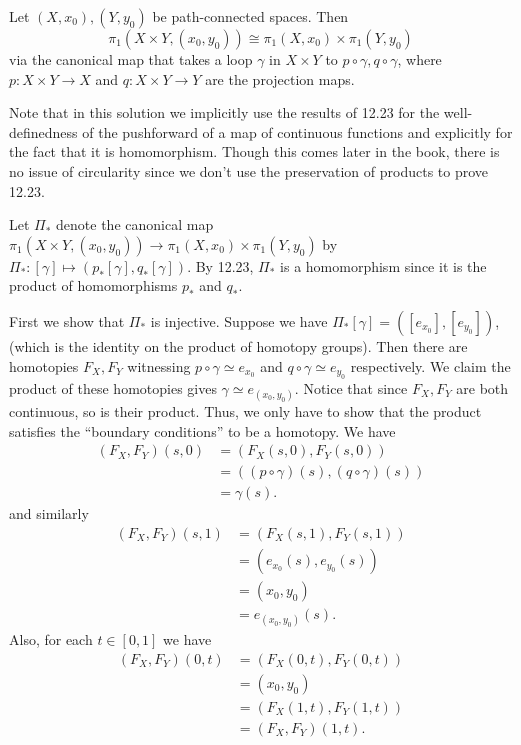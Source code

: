 \documentclass[12 pt, letterpaper]{hmcpset}
\begin{document}
\begin{problem}[12.20]
	Let $(X, x_{0}), (Y, y_{0})$ be path-connected spaces. Then
	\[
		\pi_{1}(X \times Y, (x_{0}, y_{0})) \cong \pi_{1}(X, x_{0}) \times \pi_{1}(Y, y_{0})
	\]
	via the canonical map that takes a loop $\gamma$ in $X \times Y$ to $p \circ \gamma, q \circ \gamma$, where $p : X \times Y \to X$ and $q : X \times Y \to Y$ are the projection maps.
\end{problem}

\begin{solution}
	Note that in this solution we implicitly use the results of 12.23 for the well-definedness of the pushforward of a map of continuous functions and explicitly for the fact that it is homomorphism. Though this comes later in the book, there is no issue of circularity since we don't use the preservation of products to prove 12.23.

	Let $\Pi_{*}$ denote the canonical map $\pi_{1}(X \times Y, (x_{0}, y_{0})) \to \pi_{1}(X, x_{0}) \times \pi_{1}(Y, y_{0})$ by $\Pi_{*} : [\gamma] \mapsto (p_{*} [\gamma], q_{*} [\gamma])$. By 12.23, $\Pi_{*}$ is a homomorphism since it is the product of homomorphisms $p_{*}$ and $q_{*}$.

	First we show that $\Pi_{*}$ is injective. Suppose we have $\Pi_{*}[\gamma] = ([e_{x_{0}}], [e_{y_{0}}])$, (which is the identity on the product of homotopy groups). Then there are homotopies $F_{X}, F_{Y}$ witnessing $p \circ \gamma \simeq e_{x_{0}}$ and $q \circ \gamma \simeq e_{y_{0}}$ respectively. We claim the product of these homotopies gives $\gamma \simeq e_{(x_{0}, y_{0})}$. Notice that since $F_{X}, F_{Y}$ are both continuous, so is their product. Thus, we only have to show that the product satisfies the ``boundary conditions'' to be a homotopy. We have
	\begin{align*}
		(F_{X}, F_{Y})(s, 0) & = (F_{X}(s, 0), F_{Y}(s, 0)) \\
				     & = ((p \circ \gamma)(s), (q \circ \gamma)(s)) \\
				     & = \gamma(s).
	\end{align*}
	and similarly
	\begin{align*}
		(F_{X}, F_{Y})(s, 1) & = (F_{X}(s, 1), F_{Y}(s, 1)) \\
				     & = (e_{x_{0}}(s), e_{y_{0}}(s)) \\
				     & = (x_{0}, y_{0}) \\
				     & = e_{(x_{0}, y_{0})}(s).
	\end{align*}
	Also, for each $t \in [0, 1]$ we have
	\begin{align*}
		(F_{X}, F_{Y})(0, t) & = (F_{X}(0, t), F_{Y}(0, t)) \\
				     & = (x_{0}, y_{0}) \\
				     & = (F_{X}(1, t), F_{Y}(1, t)) \\
				     & = (F_{X}, F_{Y})(1, t).
	\end{align*}


\end{solution}
\end{document}
